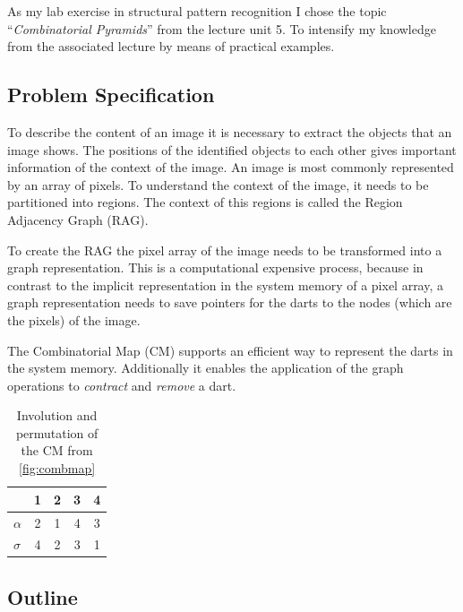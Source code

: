 \documentclass[12pt]{article}
\begin{document}
As my lab exercise in structural pattern recognition I chose the topic ``\emph{Combinatorial Pyramids}'' from the lecture unit 5. To intensify my knowledge from the associated lecture by means of practical examples.


\subsection{Problem Specification} %
\label{sub:problem}

To describe the content of an image it is necessary to extract the objects that an image shows.
The positions of the identified objects to each other gives important information of the context of the image.
An image is most commonly represented by an array of pixels.
To understand the context of the image, it needs to be partitioned into regions.
The context of this regions is called the Region Adjacency Graph (RAG).
\par
To create the RAG the pixel array of the image needs to be transformed into a graph representation.
This is a computational expensive process, because in contrast to the implicit representation in the system memory of a pixel array, a graph representation needs to save pointers for the darts to the nodes (which are the pixels) of the image.
\par
The Combinatorial Map (CM) supports an efficient way to represent the darts in the system memory.
Additionally it enables the application of the graph operations to \emph{contract} and \emph{remove} a dart.


\begin{table}[tb]
  \caption{Involution and permutation of the CM from \cref{fig:combmap}}\label{tab:combmap}
  \centering

  \begin{tabular}{lcccc}
  & \textbf{1} & \textbf{2} & \textbf{3} & \textbf{4} \\
  \midrule
     \( \alpha \)& 2 & 1 & 4 & 3\\
     \( \sigma \)& 4 & 2 & 3 & 1\\
  \bottomrule
  \end{tabular}
\end{table}

\subsection{Outline} %
\label{sub:outline}
\end{document}
